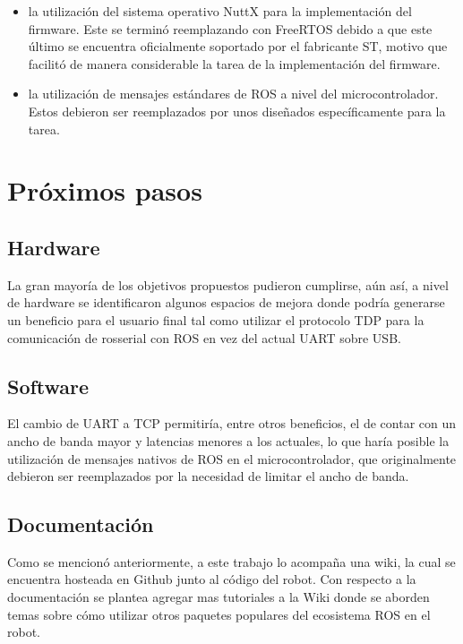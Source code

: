 \begin{itemize}
    \item la utilización del sistema operativo NuttX para la implementación del firmware. Este se terminó reemplazando con FreeRTOS debido a que este último se encuentra oficialmente soportado por el fabricante ST, motivo que facilitó de manera considerable la tarea de la implementación del firmware.
    \item la utilización de mensajes estándares de ROS a nivel del microcontrolador. Estos debieron ser reemplazados por unos diseñados específicamente para la tarea.
\end{itemize}

\section{Próximos pasos}

\subsection{Hardware}

La gran mayoría de los objetivos propuestos pudieron cumplirse, aún así, a nivel de hardware se identificaron algunos espacios de mejora donde podría generarse un beneficio para el usuario final tal como utilizar el protocolo TDP para la comunicación de rosserial con ROS en vez del actual UART sobre USB.

\subsection{Software}

El cambio de UART a TCP permitiría, entre otros beneficios, el de contar con un ancho de banda mayor y latencias menores a los actuales, lo que haría posible la utilización de mensajes nativos de ROS en el microcontrolador, que originalmente debieron ser reemplazados por la necesidad de limitar el ancho de banda.

\subsection{Documentación}

Como se mencionó anteriormente, a este trabajo lo acompaña una wiki, la cual se encuentra hosteada en Github junto al código del robot. Con respecto a la documentación se plantea agregar mas tutoriales a la Wiki donde se aborden temas sobre cómo utilizar otros paquetes populares del ecosistema ROS en el robot.